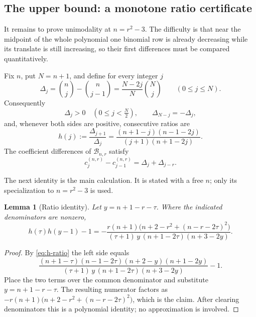 \documentclass[11pt]{article}
\theoremstyle{research}
\newtheorem{lemma}[theorem]{Lemma}
\theoremstyle{definition}
\newcommand{\TS}{\mathcal B}
\numberwithin{equation}{section}
\begin{document}
\subsection{The upper bound: a monotone ratio certificate}
\label{sec:twoshift-upper}
It remains to prove unimodality at $n=r^2-3$. The difficulty is that near
the midpoint of the whole polynomial one binomial row is already decreasing
while its translate is still increasing, so their first differences must be
compared quantitatively.

Fix $n$, put $N=n+1$, and define for every integer $j$
\begin{equation}\label{eq:Delta}
 \Delta_j=\binom nj-\binom n{j-1}
        =\frac{N-2j}{N}\binom Nj
        \qquad(0\le j\le N).
\end{equation}
Consequently
\begin{equation}\label{eq:d-sign-reflection}
 \Delta_j>0\quad\left(0\le j<\tfrac N2\right),
 \qquad \Delta_{N-j}=-\Delta_j,
\end{equation}
and, whenever both sides are positive, consecutive ratios are
\begin{equation}\label{eq:h-ratio}
 h(j):=\frac{\Delta_{j+1}}{\Delta_j}
    =\frac{(n+1-j)(n-1-2j)}{(j+1)(n+1-2j)} .
\end{equation}
The coefficient differences of $\TS_{n,r}$ satisfy
\begin{equation}\label{eq:sum-differences}
 c_j^{(n,r)}-c_{j-1}^{(n,r)}=\Delta_j+\Delta_{j-r}.
\end{equation}

The next identity is the main calculation. It is stated with a free $n$;
only its specialization to $n=r^2-3$ is used.

\begin{lemma}[Ratio identity]\label{lem:ratio}
Let $y=n+1-r-\tau$. Where the indicated denominators are nonzero,
\begin{equation}\label{eq:ratio-identity}
 h(\tau)h(y-1)-1
 =-\frac{r(n+1)\bigl(n+2-r^2+(n-r-2\tau)^2\bigr)}
 {(\tau+1)\,y\,(n+1-2\tau)(n+3-2y)} .
\end{equation}
\end{lemma}
\begin{proof}
By \eqref{eq:h-ratio} the left side equals
\[
 \frac{(n+1-\tau)(n-1-2\tau)(n+2-y)(n+1-2y)}
      {(\tau+1)\,y\,(n+1-2\tau)(n+3-2y)}-1 .
\]
Place the two terms over the common denominator and substitute
$y=n+1-r-\tau$. The resulting numerator factors as
$-r(n+1)\bigl(n+2-r^2+(n-r-2\tau)^2\bigr)$, which is the claim. After
clearing denominators this is a polynomial identity; no approximation is
involved.
\end{proof}
\end{document}
